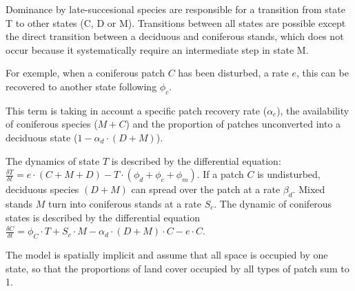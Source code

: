 Dominance by late-succesional species are responsible for a transition from
state T to other states (C, D or M). Transitions between all states are
possible  except the direct transition between a deciduous and coniferous
stands, which does not occur because it systematically require an intermediate
step in state M.



For exemple, when a coniferous patch $C$ has been disturbed, a rate $e$, this can be
recovered to another state following $\phi_c$. 


This term is taking in account a specific patch recovery rate ($\alpha_{c}$),
the availability of coniferous species ($M+C$) and the proportion of patches
unconverted into a deciduous state ($1- \alpha_d \cdot (D +M)$).


The dynamics of state $T$ is described by the differential equation:
$\frac{\delta T}{\delta t} = e \cdot (C+M+D) - T \cdot (\phi_d + \phi_c +
\phi_m)$. If a patch $C$ is undisturbed, deciduous species $(D+M)$ can spread
over the patch at a rate $\beta_d$. Mixed stands $M$ turn into coniferous
stands at a rate $S_c$.  The dynamic of coniferous states is described by the
differential equation $\frac{\delta C}{\delta t} = \phi_C \cdot T + S_c \cdot
M - \alpha_d \cdot (D+M)\cdot C - e \cdot C$. 


The model is spatially implicit and assume that all space is occupied by one
state, so that the proportions of land cover occupied by all types of patch
sum to 1. 


